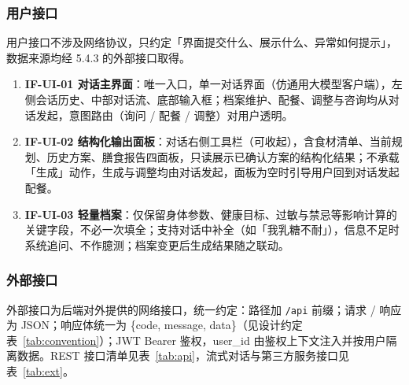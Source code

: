 \documentclass[12pt,a4paper]{ctexart}
\begin{document}
\subsubsection{用户接口}

用户接口不涉及网络协议，只约定「界面提交什么、展示什么、异常如何提示」，数据来源均经 5.4.3 的外部接口取得。

\begin{enumerate}
\item \textbf{IF-UI-01 对话主界面}：唯一入口，单一对话界面（仿通用大模型客户端），左侧会话历史、中部对话流、底部输入框；档案维护、配餐、调整与咨询均从对话发起，意图路由（询问 / 配餐 / 调整）对用户透明。
\item \textbf{IF-UI-02 结构化输出面板}：对话右侧工具栏（可收起），含食材清单、当前规划、历史方案、膳食报告四面板，只读展示已确认方案的结构化结果；不承载「生成」动作，生成与调整均由对话发起，面板为空时引导用户回到对话发起配餐。
\item \textbf{IF-UI-03 轻量档案}：仅保留身体参数、健康目标、过敏与禁忌等影响计算的关键字段，不必一次填全；支持对话中补全（如「我乳糖不耐」），信息不足时系统追问、不作臆测；档案变更后生成结果随之联动。
\end{enumerate}

\subsubsection{外部接口}

外部接口为后端对外提供的网络接口，统一约定：路径加 \texttt{/api} 前缀；请求 / 响应为 JSON；响应体统一为 \{code, message, data\}（见设计约定表~\ref{tab:convention}）；JWT Bearer 鉴权，user\_id 由鉴权上下文注入并按用户隔离数据。REST 接口清单见表~\ref{tab:api}，流式对话与第三方服务接口见表~\ref{tab:ext}。
\end{document}
